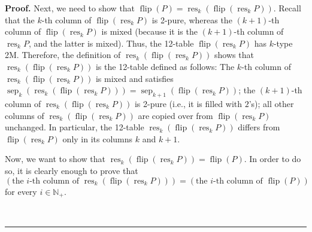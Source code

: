 \documentclass[numbers=enddot,12pt,final,onecolumn,notitlepage]{scrartcl}%
\theoremstyle{definition}
\newenvironment{proof}[1][Proof]{\noindent\textbf{#1.} }{\ \rule{0.5em}{0.5em}}
\newenvironment{verlong}{}{}
\begin{document}
\begin{verlong}
\begin{proof}
Next, we need to show that $\operatorname*{flip}\left(  P\right)
=\operatorname*{res}\nolimits_{k}\left(  \operatorname*{flip}\left(
\operatorname*{res}\nolimits_{k}P\right)  \right)  $. Recall that the $k$-th
column of $\operatorname*{flip}\left(  \operatorname*{res}\nolimits_{k}%
P\right)  $ is 2-pure, whereas the $\left(  k+1\right)  $-th column of
$\operatorname*{flip}\left(  \operatorname*{res}\nolimits_{k}P\right)  $ is
mixed (because it is the $\left(  k+1\right)  $-th column of
$\operatorname*{res}\nolimits_{k}P$, and the latter is mixed). Thus, the
12-table $\operatorname*{flip}\left(  \operatorname*{res}\nolimits_{k}%
P\right)  $ has $k$-type 2M. Therefore, the definition of $\operatorname*{res}%
\nolimits_{k}\left(  \operatorname*{flip}\left(  \operatorname*{res}%
\nolimits_{k}P\right)  \right)  $ shows that $\operatorname*{res}%
\nolimits_{k}\left(  \operatorname*{flip}\left(  \operatorname*{res}%
\nolimits_{k}P\right)  \right)  $ is the 12-table defined as follows: The
$k$-th column of $\operatorname*{res}\nolimits_{k}\left(  \operatorname*{flip}%
\left(  \operatorname*{res}\nolimits_{k}P\right)  \right)  $ is mixed and
satisfies $\operatorname*{sep}\nolimits_{k}\left(  \operatorname*{res}%
\nolimits_{k}\left(  \operatorname*{flip}\left(  \operatorname*{res}%
\nolimits_{k}P\right)  \right)  \right)  =\operatorname*{sep}\nolimits_{k+1}%
\left(  \operatorname*{flip}\left(  \operatorname*{res}\nolimits_{k}P\right)
\right)  $; the $\left(  k+1\right)  $-th column of $\operatorname*{res}%
\nolimits_{k}\left(  \operatorname*{flip}\left(  \operatorname*{res}%
\nolimits_{k}P\right)  \right)  $ is 2-pure (i.e., it is filled with $2$'s);
all other columns of $\operatorname*{res}\nolimits_{k}\left(
\operatorname*{flip}\left(  \operatorname*{res}\nolimits_{k}P\right)  \right)
$ are copied over from $\operatorname*{flip}\left(  \operatorname*{res}%
\nolimits_{k}P\right)  $ unchanged. In particular, the 12-table
$\operatorname*{res}\nolimits_{k}\left(  \operatorname*{flip}\left(
\operatorname*{res}\nolimits_{k}P\right)  \right)  $ differs from
$\operatorname*{flip}\left(  \operatorname*{res}\nolimits_{k}P\right)  $ only
in its columns $k$ and $k+1$.

Now, we want to show that $\operatorname*{res}\nolimits_{k}\left(
\operatorname*{flip}\left(  \operatorname*{res}\nolimits_{k}P\right)  \right)
=\operatorname*{flip}\left(  P\right)  $. In order to do so, it is clearly
enough to prove that%
\begin{equation}
\left(  \text{the }i\text{-th column of }\operatorname*{res}\nolimits_{k}%
\left(  \operatorname*{flip}\left(  \operatorname*{res}\nolimits_{k}P\right)
\right)  \right)  =\left(  \text{the }i\text{-th column of }%
\operatorname*{flip}\left(  P\right)  \right)
\label{pf.lem.BK.res.flip.pf.c2.icol}%
\end{equation}
for every $i\in\mathbb{N}_{+}$.


\end{proof}
\end{verlong}
\end{document}
